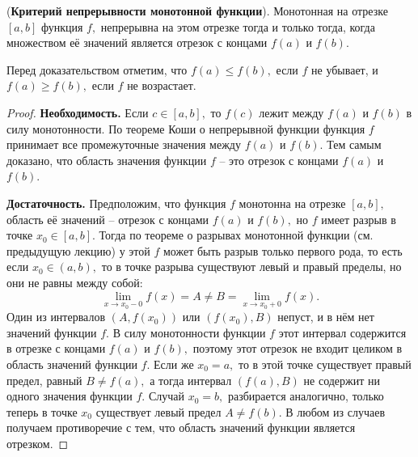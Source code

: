 \begin{theorem}(\textbf{Критерий непрерывности монотонной
        функции}).
    Монотонная на отрезке $[a, b]$ функция $f,$ непрерывна
    на  этом отрезке тогда и только тогда,
    когда множеством её значений является отрезок
    с концами $f(a)$ и $f(b)$.
\end{theorem}
Перед доказательством отметим, что $f(a)\leq f(b),$
если $f$ не убывает, и $f(a)\geq f(b),$ если
$f$ не возрастает.
\begin{proof}
    \textbf{Необходимость.} Если $c \in [a, b],$
    то $f(c)$ лежит между $f(a)$ и $f(b)$ в силу
    монотонности. По теореме Коши о непрерывной
    функции функция $f$ принимает все промежуточные
    значения между $f(a)$ и $f(b).$ Тем самым доказано,
    что область значения функции $f$ -- это отрезок
    с концами $f(a)$ и $f(b)$.

    \textbf{Достаточность.} Предположим, что функция $f$
    монотонна на отрезке $[a, b],$ область
    её значений -- отрезок с концами $f(a)$ и $f(b),$
    но $f$ имеет разрыв в точке $x_0\in[a, b]$.
    Тогда по теореме о разрывах монотонной
    функции (см. предыдущую лекцию) у
    этой $f$ может быть разрыв только первого
    рода, то есть если $x_0\in(a, b),$ то в точке
    разрыва существуют левый
    и правый пределы, но они не равны между собой:
    $$
        \lim\limits_{x\rightarrow x_0-0}f(x)=A\neq B=
        \lim\limits_{x\rightarrow x_0+0}f(x).
    $$
    Один из интервалов $(A, f(x_0))$ или
    $(f(x_0), B)$ непуст, и в нём нет значений
    функции $f.$ В силу монотонности функции $f$
    этот интервал содержится в отрезке с концами
    $f(a)$ и $f(b),$ поэтому этот отрезок
    не входит целиком в область значений функции $f$.
    Если же $x_0=a,$ то в этой точке существует
    правый предел, равный $B\neq f(a),$
    а тогда интервал $(f(a), B)$ не содержит
    ни одного значения функции $f.$
    Случай $x_0=b,$ разбирается аналогично,
    только теперь в точке $x_0$ существует левый
    предел $A\neq f(b).$ В любом из
    случаев получаем противоречие с тем,
    что область значений функции
    является отрезком.
\end{proof}

